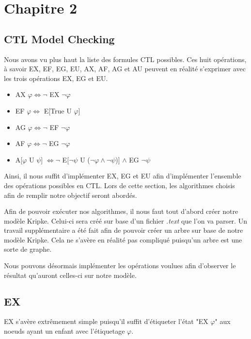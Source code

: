 \documentclass[runningheads,a4paper]{llncs}
\begin{document}
\section{Chapitre 2}
\subsection{CTL Model Checking}
Nous avons vu plus haut la liste des formules CTL possibles. Ces huit opérations, à savoir EX, EF, EG, EU, AX, AF, AG et AU peuvent en réalité s'exprimer avec les trois opérations EX, EG et EU.

\begin{itemize}
\item AX $\varphi \Leftrightarrow \lnot$ EX $ \lnot \varphi$
\item EF $\varphi \Leftrightarrow$ E[True U $\varphi$]
\item AG $\varphi \Leftrightarrow \lnot$ EF $\lnot \varphi$
\item AF $\varphi \Leftrightarrow \lnot$ EG $\lnot \varphi$
\item A[$\varphi$ U $\psi$] $\Leftrightarrow \lnot$ E[$\lnot \psi$ U ($\lnot \varphi \land \lnot \psi$)] $\land$ EG $\lnot \psi$ \\
\end{itemize}

\noindent Ainsi, il nous suffit d'implémenter EX, EG et EU afin d'implémenter l'ensemble des opérations possibles en CTL. Lors de cette section, les algorithmes choisis afin de remplir notre objectif seront abordés.

\noindent Afin de pouvoir exécuter nos algorithmes, il nous faut tout d'abord créer notre modèle Kripke. Celui-ci sera créé sur base d'un fichier \textit{.text} que l'on va parser. Un travail supplémentaire a été fait afin de pouvoir créer un arbre sur base de notre modèle Kripke. Cela ne s'avère en réalité pas compliqué puisqu'un arbre est une sorte de graphe. 

\noindent Nous pouvons désormais implémenter les opérations voulues afin d'observer le résultat qu'auront celles-ci sur notre modèle.

\subsection{EX}

EX s'avère extrêmement simple puisqu'il suffit d'étiqueter l'état "EX $\varphi$" aux noeuds ayant un enfant avec l'étiquetage $\varphi$.
\end{document}
